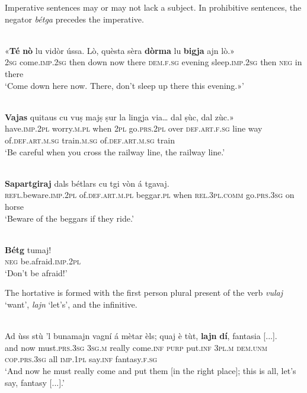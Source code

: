 Imperative sentences may or may not lack a subject. In prohibitive sentences, the negator \textit{bétga} precedes the imperative.

\ea
\label{}
\\
\gll «\textbf{Té} \textbf{nò} lu vidòr ússa. Lò, quèsta sèra \textbf{dòrma} lu \textbf{bigja} ajn lò.»\\
\textsc{2sg} come.\textsc{imp.2sg} then down now there  \textsc{dem.f.sg} evening sleep.\textsc{imp.2sg} then \textsc{neg} in there\\
\glt `Come down here now. There, don’t sleep up there this evening.»'
\z

\ea
\label{}
\\
\gll    \textbf{Vajas} quitaus cu vuṣ majṣ ṣur la lingja via… dal ṣùc, dal zùc.»\\
have.\textsc{imp.2pl} worry.\textsc{m.pl} when \textsc{2pl} go.\textsc{prs.2pl} over \textsc{def.art.f.sg} line way of.\textsc{def.art.m.sg} train.\textsc{m.sg} of.\textsc{def.art.m.sg} train\\
\glt `Be careful when you cross the railway line, the railway line.'
\z

\ea
\label{}
\\
\gll  \textbf{Sapartgiraj} dals bétlars cu tgi vòn á tgavaj.  \\
     \textsc{refl}.beware.\textsc{imp.2pl} of.\textsc{def.art.m.pl} beggar.\textsc{pl} when \textsc{rel.3pl.comm} go.\textsc{prs.3sg} on horse\\
\glt `Beware of the beggars if they ride.'
\z

\ea
\label{}
\\
\gll  \textbf{Bétg} tumaj!\\
     \textsc{neg} be.afraid.\textsc{imp.2pl}\\
\glt `Don’t be afraid!'
\z

The hortative is formed with the first person plural present of the verb \textit{vulaj} `want', \textit{lajn} `let's', and the infinitive.

\ea
\label{}
\\
\gll Ad ùss stù ’l bunamajn vagní á mètar èls; quaj è tùt, \textbf{lajn} \textbf{dí}, fantasia [...]. \\
and now must.\textsc{prs.3sg} \textsc{3sg.m} really come.\textsc{inf} \textsc{purp} put.\textsc{inf} \textsc{3pl.m} \textsc{dem.unm} \textsc{cop.prs.3sg} all \textsc{imp.1pl} say.\textsc{inf} fantasy.\textsc{f.sg}\\
\glt `And now he must really come and put them [in the right place]; this is all, let’s say, fantasy [...].'
\z

